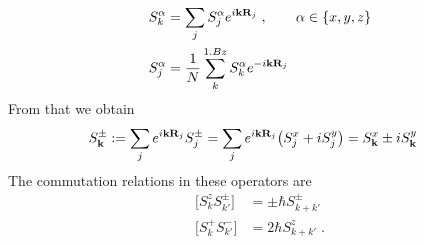 \begin{subequations}\label{eq:FT:magnetism}
\begin{align}
S_{k}^{\alpha} &= \sum_{j} S_{j}^{\alpha} e^{i \mathbf k \mathbf R_{j}}\;,\qquad \alpha\in\{x,y,z\}\\
S_{j}^{\alpha}&=\frac{1}{N} \sum_{k}^{1.Bz} S_{k}^{\alpha} e^{-i \mathbf k \mathbf R_{j}}
\end{align}
\end{subequations}
%
From that we obtain
%
\begin{align}
S_{\mathbf k}^{\pm} &:= \sum_{j} e^{i\mathbf k \mathbf R_{j}} S_{j}^{\pm}
=\sum_{j} e^{i\mathbf k \mathbf R_{j}}\big(S_{j}^{x}+i S_{j}^{y}\big)
= S_{\mathbf k}^{x} \pm i S_{\mathbf k}^{y}
\end{align}
%
The commutation relations in these operators are
\begin{subequations}\label{eq:}
\begin{align}
\big[ S^{z}_{k} S^{\pm}_{k'}\big] &= \pm \hbar S_{k+k'}^{\pm}\\
\big[ S^{+}_{k} S^{-}_{k'}\big] &= 2 \hbar S_{k+k'}^{z}\;.
\end{align}
\end{subequations}
%

